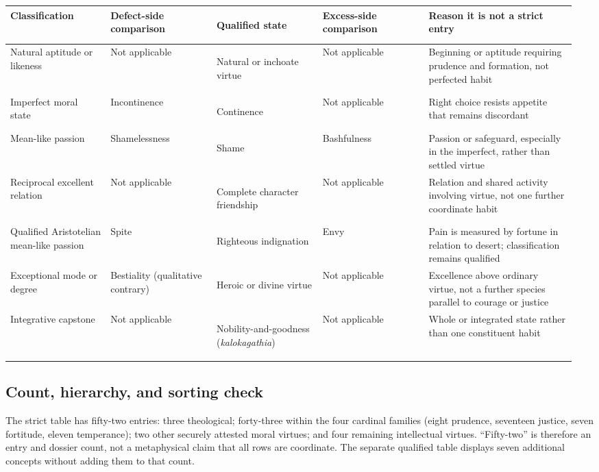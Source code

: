 \begin{landscape}
\begingroup
\footnotesize
\setlength{\tabcolsep}{3pt}
\renewcommand{\arraystretch}{1.13}
\begin{longtable}{@{}>{\raggedright\arraybackslash}p{0.17\linewidth}>{\raggedright\arraybackslash}p{0.18\linewidth}>{\bfseries\raggedright\arraybackslash}p{0.18\linewidth}>{\raggedright\arraybackslash}p{0.18\linewidth}>{\raggedright\arraybackslash}p{0.25\linewidth}@{}}
\toprule
\textbf{Classification} & \textbf{Defect-side comparison} & \textbf{Qualified state} & \textbf{Excess-side comparison} & \textbf{Reason it is not a strict entry}\\
\midrule
\endhead
Natural aptitude or likeness & Not applicable & Natural or inchoate virtue & Not applicable & Beginning or aptitude requiring prudence and formation, not perfected habit\\
Imperfect moral state & Incontinence & Continence & Not applicable & Right choice resists appetite that remains discordant\\
Mean-like passion & Shamelessness & Shame & Bashfulness & Passion or safeguard, especially in the imperfect, rather than settled virtue\\
Reciprocal excellent relation & Not applicable & Complete character friendship & Not applicable & Relation and shared activity involving virtue, not one further coordinate habit\\
Qualified Aristotelian mean-like passion & Spite & Righteous indignation & Envy & Pain is measured by fortune in relation to desert; classification remains qualified\\
Exceptional mode or degree & Bestiality (qualitative contrary) & Heroic or divine virtue & Not applicable & Excellence above ordinary virtue, not a further species parallel to courage or justice\\
Integrative capstone & Not applicable & Nobility-and-goodness (\emph{kalokagathia}) & Not applicable & Whole or integrated state rather than one constituent habit\\
\bottomrule
\end{longtable}
\endgroup

\subsection{Count, hierarchy, and sorting check}

The strict table has fifty-two entries: three theological; forty-three within the four cardinal families (eight prudence, seventeen justice, seven fortitude, eleven temperance); two other securely attested moral virtues; and four remaining intellectual virtues. “Fifty-two” is therefore an entry and dossier count, not a metaphysical claim that all rows are coordinate. The separate qualified table displays seven additional concepts without adding them to that count.


\end{landscape}
